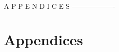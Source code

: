 


\cleardoublepage 
{}

\renewcommand*{\bibname}{References} %


\nocite{*}


A P P E N D I C E S
-------------------
\appendix
\chapter*{Appendices} %

